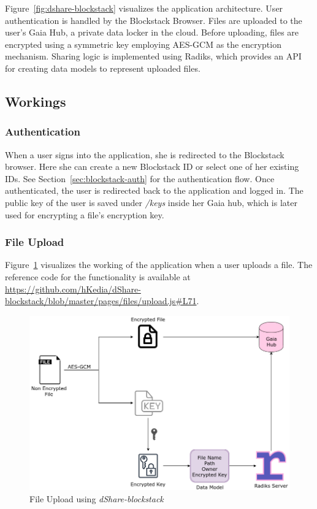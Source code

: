 Figure~\ref{fig:dshare-blockstack} visualizes the application architecture. User authentication is handled by the Blockstack Browser. Files are uploaded to the user's Gaia Hub, a private data locker in the cloud. Before uploading, files are encrypted using a symmetric key employing AES-GCM as the encryption mechanism. Sharing logic is implemented using Radiks, which provides an API for creating data models to represent uploaded files.

\subsection{Workings}

\subsubsection{Authentication}
When a user signs into the application, she is redirected to the Blockstack browser. Here she can create a new Blockstack ID or select one of her existing IDs. See Section~\ref{sec:blockstack-auth} for the authentication flow. Once authenticated, the user is redirected back to the application and logged in. The public key of the user is saved under \textit{/keys} inside her Gaia hub, which is later used for encrypting a file's encryption key.

\subsubsection{File Upload}
Figure~\ref{fig:blockstack-upload} visualizes the working of the application when a user uploads a file. The reference code for the functionality is available at \url{https://github.com/hKedia/dShare-blockstack/blob/master/pages/files/upload.js#L71}.

\begin{figure}[h]
	\includegraphics[width=\linewidth]{figures/blockstack-upload}
	\caption{\label{fig:blockstack-upload} File Upload using \textit{dShare-blockstack}}
\end{figure}

